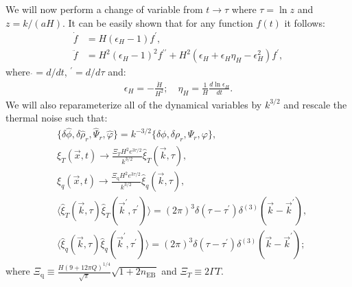 We will now perform a change of variable from $t\rightarrow \tau$ where $\tau=\ln z$ and $z=k/(aH)$. It can be easily shown that for any function $f(t)$ it follows:
\begin{align}
    \dot{f}&=H(\epsilon_H-1)f^\prime, \\
    \ddot{f}&=H^2(\epsilon_H-1)^2 f^{\prime\prime}+H^2(\epsilon_H+\epsilon_H\eta_H-\epsilon_H^2)f^\prime,
\end{align}
where $\dot{}=d/dt$, $^\prime=d/d\tau$ and:
\begin{align}
    \epsilon_H=-\frac{\dot{H}}{H^2}; \quad \eta_H=\frac{1}{H}\frac{d\ln\epsilon_H}{dt}.
\end{align}
We will also reparameterize all of the dynamical variables by $k^{3/2}$ and rescale the thermal noise such that:
\begin{align}
&\{\delta\hat{\phi},\delta\hat{\rho}_r,\hat{\Psi}_r,\hat{\varphi}\}=k^{-3/2}\{\delta\phi,\delta\rho_r,\Psi_r,\varphi\}, \\
& \xi_T(\vec{x},t)\rightarrow \frac{\Xi_T H^2e^{3\tau/2}}{k^{3/2}}\hat{\xi}_T(\vec{k},\tau),\\
& \xi_q(\vec{x},t)\rightarrow \frac{\Xi_{\mathrm{q}}H^2e^{3\tau/2}}{k^{3/2}}\hat{\xi}_q(\vec{k},\tau),\\
&\langle\hat{\xi}_T(\vec{k},\tau) \hat{\xi}_T(\vec{k}^\prime,\tau^\prime)\rangle=(2\pi)^3\delta\left(\tau-\tau^{\prime}\right) \delta^{(3)}(\vec{k}-\vec{k}^{\prime}),\\
&\langle\hat{\xi}_q(\vec{k},\tau) \hat{\xi}_q(\vec{k}^\prime,\tau^\prime)\rangle=(2\pi)^3\delta\left(\tau-\tau^{\prime}\right) \delta^{(3)}(\vec{k}-\vec{k}^{\prime});
\end{align}
where $\Xi_{\mathrm{q}}\equiv \frac{H(9+12\pi Q)^{1/4}}{ \sqrt{\pi}}\sqrt{1+2n_{\mathrm{EB}}}$ and $\Xi_T\equiv 2\Gamma T$.

